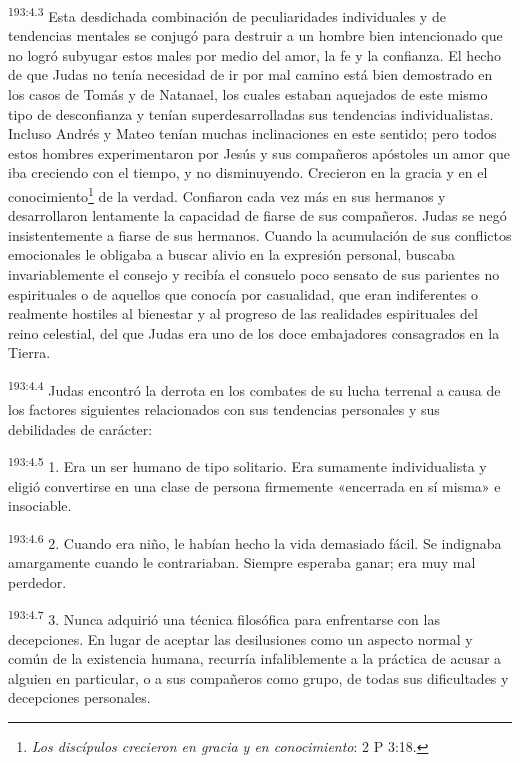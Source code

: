 \par 
\textsuperscript{193:4.3} Esta desdichada combinación de peculiaridades individuales y de tendencias mentales se conjugó para destruir a un hombre bien intencionado que no logró subyugar estos males por medio del amor, la fe y la confianza. El hecho de que Judas no tenía necesidad de ir por mal camino está bien demostrado en los casos de Tomás y de Natanael, los cuales estaban aquejados de este mismo tipo de desconfianza y tenían superdesarrolladas sus tendencias individualistas. Incluso Andrés y Mateo tenían muchas inclinaciones en este sentido; pero todos estos hombres experimentaron por Jesús y sus compañeros apóstoles un amor que iba creciendo con el tiempo, y no disminuyendo. Crecieron en la gracia y en el conocimiento\footnote{\textit{Los discípulos crecieron en gracia y en conocimiento}: 2 P 3:18.} de la verdad. Confiaron cada vez más en sus hermanos y desarrollaron lentamente la capacidad de fiarse de sus compañeros. Judas se negó insistentemente a fiarse de sus hermanos. Cuando la acumulación de sus conflictos emocionales le obligaba a buscar alivio en la expresión personal, buscaba invariablemente el consejo y recibía el consuelo poco sensato de sus parientes no espirituales o de aquellos que conocía por casualidad, que eran indiferentes o realmente hostiles al bienestar y al progreso de las realidades espirituales del reino celestial, del que Judas era uno de los doce embajadores consagrados en la Tierra.

\par 
\textsuperscript{193:4.4} Judas encontró la derrota en los combates de su lucha terrenal a causa de los factores siguientes relacionados con sus tendencias personales y sus debilidades de carácter:

\par 
\textsuperscript{193:4.5} 1. Era un ser humano de tipo solitario. Era sumamente individualista y eligió convertirse en una clase de persona firmemente «encerrada en sí misma» e insociable.

\par 
\textsuperscript{193:4.6} 2. Cuando era niño, le habían hecho la vida demasiado fácil. Se indignaba amargamente cuando le contrariaban. Siempre esperaba ganar; era muy mal perdedor.

\par 
\textsuperscript{193:4.7} 3. Nunca adquirió una técnica filosófica para enfrentarse con las decepciones. En lugar de aceptar las desilusiones como un aspecto normal y común de la existencia humana, recurría infaliblemente a la práctica de acusar a alguien en particular, o a sus compañeros como grupo, de todas sus dificultades y decepciones personales.

